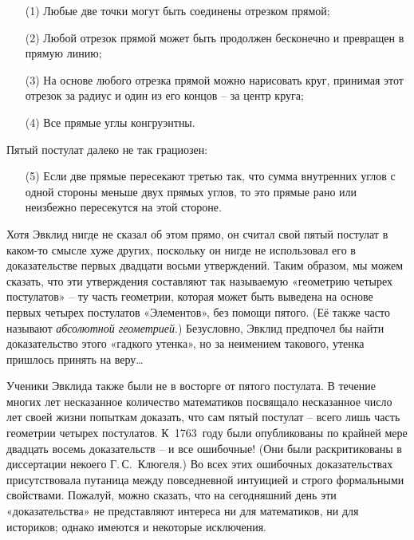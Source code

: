 \documentclass[../main.tex]{subfiles}
\begin{document}
\begin{itemize}[label={}, noitemsep, topsep=6pt]
    \item[(1)] Любые две точки могут быть соединены отрезком прямой;

    \item[(2)] Любой отрезок прямой может быть продолжен бесконечно и превращен в прямую линию;

    \item[(3)] На основе любого отрезка прямой можно нарисовать круг, принимая этот отрезок за радиус и один из его концов \--- за центр круга;

    \item[(4)] Все прямые углы конгруэнтны.
\end{itemize}

Пятый постулат далеко не так грациозен:

\begin{itemize}[label={}, noitemsep, topsep=6pt]
    \item[(5)] Если две прямые пересекают третью так, что сумма внутренних углов с одной стороны меньше двух прямых углов, то это прямые рано или неизбежно пересекутся на этой стороне.
\end{itemize}

Хотя Эвклид нигде не сказал об этом прямо, он считал свой пятый постулат в каком-то смысле хуже других, поскольку он нигде не использовал его в доказательстве первых двадцати восьми утверждений. Таким образом, мы можем сказать, что эти утверждения составляют так называемую «геометрию четырех постулатов» \--- ту часть геометрии, которая может быть выведена на основе первых четырех постулатов «Элементов», без помощи пятого. (Её также часто называют \emph{абсолютной геометрией}.) Безусловно, Эвклид предпочел бы найти доказательство этого «гадкого утенка», но за неимением такового, утенка пришлось принять на веру\ldots{}

Ученики Эвклида также были не в восторге от пятого постулата. В течение многих лет несказанное количество математиков посвящало несказанное число лет своей жизни попыткам доказать, что сам пятый постулат \--- всего лишь часть геометрии четырех постулатов. К~1763~году были опубликованы по крайней мере двадцать восемь доказательств \--- и все ошибочные! (Они были раскритикованы в диссертации некоего Г.\,С.~Клюгеля.) Во всех этих ошибочных доказательствах присутствовала путаница между повседневной интуицией и строго формальными свойствами. Пожалуй, можно сказать, что на сегодняшний день эти «доказательства» не представляют интереса ни для математиков, ни для историков; однако имеются и некоторые исключения.
\end{document}
